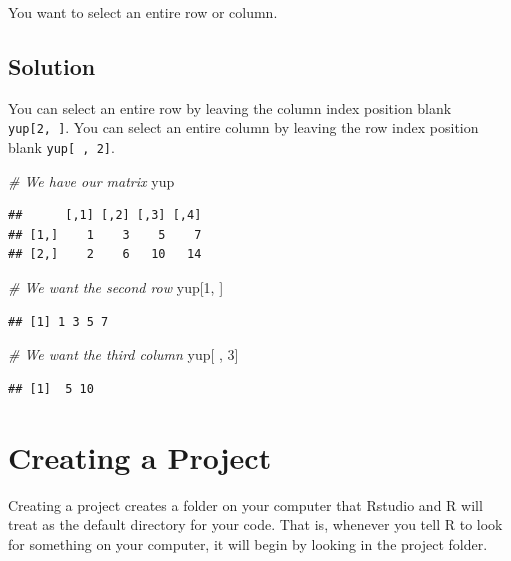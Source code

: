 \documentclass[
]{book}
\newenvironment{Shaded}{\begin{snugshade}}{\end{snugshade}}
\newcommand{\CommentTok}[1]{\textcolor[rgb]{0.56,0.35,0.01}{\textit{#1}}}
\newcommand{\DecValTok}[1]{\textcolor[rgb]{0.00,0.00,0.81}{#1}}
\newcommand{\NormalTok}[1]{#1}
\begin{document}
You want to select an entire row or column.

\hypertarget{solution-4}{%
\subsection{Solution}\label{solution-4}}

You can select an entire row by leaving the column index position blank \texttt{yup{[}2,\ {]}}. You can select an entire column by leaving the row index position blank \texttt{yup{[}\ ,\ 2{]}}.

\begin{Shaded}
\begin{Highlighting}[]
\CommentTok{\# We have our matrix}
\NormalTok{yup}
\end{Highlighting}
\end{Shaded}

\begin{verbatim}
##      [,1] [,2] [,3] [,4]
## [1,]    1    3    5    7
## [2,]    2    6   10   14
\end{verbatim}

\begin{Shaded}
\begin{Highlighting}[]
\CommentTok{\# We want the second row}
\NormalTok{yup[}\DecValTok{1}\NormalTok{, ]}
\end{Highlighting}
\end{Shaded}

\begin{verbatim}
## [1] 1 3 5 7
\end{verbatim}

\begin{Shaded}
\begin{Highlighting}[]
\CommentTok{\# We want the third column}
\NormalTok{yup[ , }\DecValTok{3}\NormalTok{]}
\end{Highlighting}
\end{Shaded}

\begin{verbatim}
## [1]  5 10
\end{verbatim}

\hypertarget{project}{%
\section{Creating a Project}\label{project}}

Creating a project creates a folder on your computer that Rstudio and R will treat as the default directory for your code. That is, whenever you tell R to look for something on your computer, it will begin by looking in the project folder.
\end{document}
